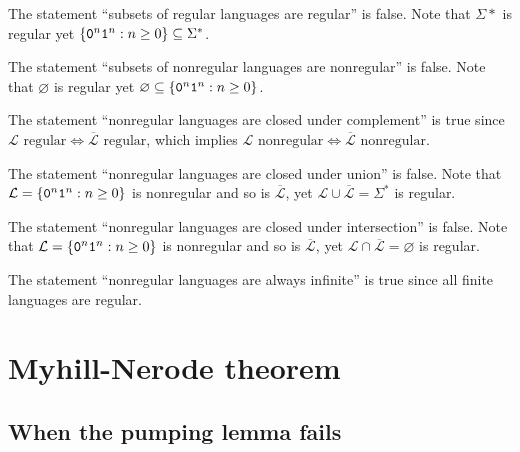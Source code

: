 \documentclass{notes}
\begin{document}
\begin{eg}
  The statement ``subsets of regular languages are regular'' is false.
  Note that $\Sigma*$ is regular yet $\left \{ \verb~0~^n \verb~1~^n : n \geq 0 \right \} \subseteq \Sigma^*$.
\end{eg}

\begin{eg}
  The statement ``subsets of nonregular languages are nonregular'' is false.
  Note that $\varnothing$ is regular yet $\varnothing \subseteq \left \{ \verb~0~^n \verb~1~^n : n \geq 0 \right \}$.
\end{eg}

\begin{eg}
  The statement ``nonregular languages are closed under complement'' is true since $\text{$\mathcal L$ regular} \Leftrightarrow \text{$\overline{\mathcal L}$ regular}$, which implies $\text{$\mathcal L$ nonregular} \Leftrightarrow \text{$\overline{\mathcal L}$ nonregular}$.
\end{eg}

\begin{eg}
  The statement ``nonregular languages are closed under union'' is false.
  Note that $\mathcal L = \left \{ \verb~0~^n \verb~1~^n : n \geq 0 \right \}$ is nonregular and so is $\overline{\mathcal L}$, yet $\mathcal L \cup \overline{\mathcal L} = \Sigma^*$ is regular.
\end{eg}

\begin{eg}
  The statement ``nonregular languages are closed under intersection'' is false.
  Note that $\mathcal L = \left \{ \verb~0~^n \verb~1~^n : n \geq 0 \right \}$ is nonregular and so is $\overline{\mathcal L}$, yet $\mathcal L \cap \overline{\mathcal L} = \varnothing$ is regular.
\end{eg}

\begin{eg}
  The statement ``nonregular languages are always infinite'' is true since all finite languages are regular.
\end{eg}

\section{Myhill-Nerode theorem}

\subsection{When the pumping lemma fails}
\end{document}
